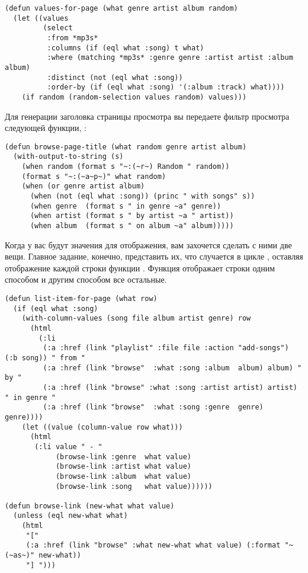 \begin{lstlisting}
(defun values-for-page (what genre artist album random)
  (let ((values
         (select 
          :from *mp3s*
          :columns (if (eql what :song) t what)
          :where (matching *mp3s* :genre genre :artist artist :album album)
          :distinct (not (eql what :song))
          :order-by (if (eql what :song) '(:album :track) what))))
    (if random (random-selection values random) values)))
\end{lstlisting}

Для генерации заголовка страницы просмотра вы передаете фильтр просмотра следующей
функции, :

\begin{lstlisting}
(defun browse-page-title (what random genre artist album)
  (with-output-to-string (s)
    (when random (format s "~:(~r~) Random " random))
    (format s "~:(~a~p~)" what random)
    (when (or genre artist album)
      (when (not (eql what :song)) (princ " with songs" s))
      (when genre  (format s " in genre ~a" genre))
      (when artist (format s " by artist ~a " artist))
      (when album  (format s " on album ~a" album)))))
\end{lstlisting}

Когда у вас будут значения для отображения, вам захочется сделать с ними две вещи. Главное
задание, конечно, представить их, что случается в цикле , оставляя
отображение каждой строки функции . Функция отображает строки
 одним способом и другим способом все остальные. 

\begin{lstlisting}
(defun list-item-for-page (what row)
  (if (eql what :song)
    (with-column-values (song file album artist genre) row
      (html
        (:li
         (:a :href (link "playlist" :file file :action "add-songs") (:b song)) " from "
         (:a :href (link "browse"  :what :song :album  album) album) " by "
         (:a :href (link "browse" :what :song :artist artist) artist) " in genre "
         (:a :href (link "browse"  :what :song :genre  genre) genre))))
    (let ((value (column-value row what)))
      (html
       (:li value " - "
            (browse-link :genre  what value)
            (browse-link :artist what value)
            (browse-link :album  what value)
            (browse-link :song   what value))))))

(defun browse-link (new-what what value)
  (unless (eql new-what what)
    (html
     "[" 
     (:a :href (link "browse" :what new-what what value) (:format "~(~as~)" new-what))
     "] ")))
\end{lstlisting}


